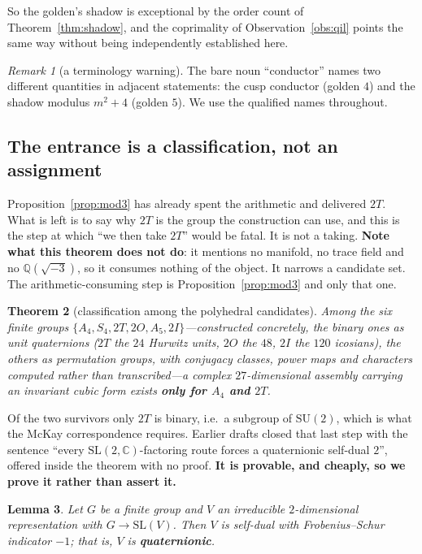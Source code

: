 \documentclass[11pt,reqno]{amsart}
\theoremstyle{plain}
\newtheorem{theorem}{Theorem}[section]
\newtheorem{lemma}[theorem]{Lemma}
\theoremstyle{definition}
\theoremstyle{remark}
\newtheorem{remark}[theorem]{Remark}
\newcommand{\Q}{\mathbb{Q}}
\newcommand{\C}{\mathbb{C}}
\newcommand{\SL}{\mathrm{SL}}
\newcommand{\SU}{\mathrm{SU}}
\begin{document}
So the golden's shadow is exceptional by the order count of
Theorem~\ref{thm:shadow}, and the coprimality of Observation~\ref{obs:qil} points the
same way without being independently established here.

\begin{remark}[a terminology warning]
The bare noun ``conductor'' names two different quantities in adjacent statements: the
cusp conductor (golden $4$) and the shadow modulus $m^2+4$ (golden $5$). We use the
qualified names throughout.
\end{remark}

\subsection{The entrance is a classification, not an assignment}\label{sec:classification}

Proposition~\ref{prop:mod3} has already spent the arithmetic and delivered $2T$. What is
left is to say why $2T$ is the group the construction can use, and this is the step at
which ``we then take $2T$'' would be fatal. It is not a taking. \textbf{Note what this
theorem does not do}: it mentions no manifold, no trace field and no $\Q(\sqrt{-3})$, so
it consumes nothing of the object. It narrows a candidate set. The arithmetic-consuming
step is Proposition~\ref{prop:mod3} and only that one.

\begin{theorem}[classification among the polyhedral candidates]\label{thm:classify}
Among the six finite groups $\{A_4,S_4,2T,2O,A_5,2I\}$---constructed
concretely, the binary ones as unit quaternions ($2T$ the $24$ Hurwitz units, $2O$ the
$48$, $2I$ the $120$ icosians), the others as permutation groups, with conjugacy
classes, power maps and characters computed rather than transcribed---a complex
$27$-dimensional assembly carrying an invariant cubic form exists \textbf{only for
$A_4$ and $2T$}.
\end{theorem}

Of the two survivors only $2T$ is binary, i.e.\ a subgroup of $\SU(2)$, which is what
the McKay correspondence requires. Earlier drafts closed that last step with the
sentence ``every $\SL(2,\C)$-factoring route forces a quaternionic self-dual $2$'',
offered inside the theorem with no proof. \textbf{It is provable, and cheaply, so we
prove it rather than assert it.}

\begin{lemma}\label{lem:quat}
Let $G$ be a finite group and $V$ an irreducible $2$-dimensional representation with
$G\to\SL(V)$. Then $V$ is self-dual with Frobenius--Schur indicator $-1$; that is,
$V$ is \textbf{quaternionic}.
\end{lemma}
\end{document}
